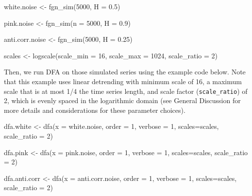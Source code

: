 \documentclass[
  man]{apa6}
\newenvironment{Shaded}{\begin{snugshade}}{\end{snugshade}}
\newcommand{\AttributeTok}[1]{\textcolor[rgb]{0.77,0.63,0.00}{#1}}
\newcommand{\DecValTok}[1]{\textcolor[rgb]{0.00,0.00,0.81}{#1}}
\newcommand{\FloatTok}[1]{\textcolor[rgb]{0.00,0.00,0.81}{#1}}
\newcommand{\FunctionTok}[1]{\textcolor[rgb]{0.00,0.00,0.00}{#1}}
\newcommand{\NormalTok}[1]{#1}
\newcommand{\OtherTok}[1]{\textcolor[rgb]{0.56,0.35,0.01}{#1}}
\begin{document}
\begin{Shaded}
\begin{Highlighting}[]
\NormalTok{white.noise }\OtherTok{\textless{}{-}} \FunctionTok{fgn\_sim}\NormalTok{(}\DecValTok{5000}\NormalTok{, }\AttributeTok{H =} \FloatTok{0.5}\NormalTok{)}

\NormalTok{pink.noise }\OtherTok{\textless{}{-}} \FunctionTok{fgn\_sim}\NormalTok{(}\AttributeTok{n =} \DecValTok{5000}\NormalTok{, }\AttributeTok{H =} \FloatTok{0.9}\NormalTok{)}

\NormalTok{anti.corr.noise }\OtherTok{\textless{}{-}} \FunctionTok{fgn\_sim}\NormalTok{(}\DecValTok{5000}\NormalTok{, }\AttributeTok{H =} \FloatTok{0.25}\NormalTok{)}

\NormalTok{scales }\OtherTok{\textless{}{-}} \FunctionTok{logscale}\NormalTok{(}\AttributeTok{scale\_min =} \DecValTok{16}\NormalTok{, }\AttributeTok{scale\_max =} \DecValTok{1024}\NormalTok{, }\AttributeTok{scale\_ratio =} \DecValTok{2}\NormalTok{)}
\end{Highlighting}
\end{Shaded}

Then, we run DFA on those simulated series using the example code below.
Note that this example uses linear detrending with minimum scale of 16,
a maximum scale that is at most 1/4 the time series length, and scale
factor (\texttt{scale\_ratio}) of 2, which is evenly spaced in the logarithmic
domain (see General Discussion for more details and considerations for
these parameter choices).

\begin{Shaded}
\begin{Highlighting}[]
\NormalTok{dfa.white }\OtherTok{\textless{}{-}} \FunctionTok{dfa}\NormalTok{(}\AttributeTok{x =}\NormalTok{ white.noise, }\AttributeTok{order =} \DecValTok{1}\NormalTok{, }\AttributeTok{verbose =} \DecValTok{1}\NormalTok{, }\AttributeTok{scales=}\NormalTok{scales, }\AttributeTok{scale\_ratio =} \DecValTok{2}\NormalTok{)}

\NormalTok{dfa.pink }\OtherTok{\textless{}{-}} \FunctionTok{dfa}\NormalTok{(}\AttributeTok{x =}\NormalTok{ pink.noise, }\AttributeTok{order =} \DecValTok{1}\NormalTok{, }\AttributeTok{verbose =} \DecValTok{1}\NormalTok{,}
\AttributeTok{scales=}\NormalTok{scales, }\AttributeTok{scale\_ratio =} \DecValTok{2}\NormalTok{)}

\NormalTok{dfa.anti.corr }\OtherTok{\textless{}{-}} \FunctionTok{dfa}\NormalTok{(}\AttributeTok{x =}\NormalTok{ anti.corr.noise, }\AttributeTok{order =} \DecValTok{1}\NormalTok{, }\AttributeTok{verbose =} \DecValTok{1}\NormalTok{, }\AttributeTok{scales=}\NormalTok{scales, }\AttributeTok{scale\_ratio =} \DecValTok{2}\NormalTok{)}
\end{Highlighting}
\end{Shaded}
\end{document}
